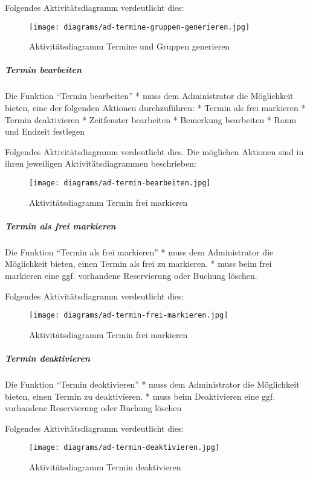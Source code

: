 \documentclass[]{article}
\let\oldsubparagraph\subparagraph
\renewcommand{\subparagraph}[1]{\oldsubparagraph{#1}\mbox{}}
\begin{document}
Folgendes Aktivitätsdiagramm verdeutlicht dies:

\begin{figure}
\centering
\texttt{[image: diagrams/ad-termine-gruppen-generieren.jpg]}
\caption{Aktivitätsdiagramm Termine und Gruppen generieren}
\end{figure}

\hypertarget{termin-bearbeiten-1}{%
\subparagraph{Termin bearbeiten}\label{termin-bearbeiten-1}}

Die Funktion ``Termin bearbeiten'' * muss dem Administrator die
Möglichkeit bieten, eine der folgenden Aktionen durchzuführen: * Termin
als frei markieren * Termin deaktivieren * Zeitfenster bearbeiten *
Bemerkung bearbeiten * Raum und Endzeit festlegen

Folgendes Aktivitätsdiagramm verdeutlicht dies. Die möglichen Aktionen
sind in ihren jeweiligen Aktivitätsdiagrammen beschrieben:

\begin{figure}
\centering
\texttt{[image: diagrams/ad-termin-bearbeiten.jpg]}
\caption{Aktivitätsdiagramm Termin frei markieren}
\end{figure}

\hypertarget{termin-als-frei-markieren}{%
\subparagraph{Termin als frei
markieren}\label{termin-als-frei-markieren}}

Die Funktion ``Termin als frei markieren'' * muss dem Administrator die
Möglichkeit bieten, einen Termin als frei zu markieren. * muss beim frei
markieren eine ggf. vorhandene Reservierung oder Buchung löschen.

Folgendes Aktivitätsdiagramm verdeutlicht dies:

\begin{figure}
\centering
\texttt{[image: diagrams/ad-termin-frei-markieren.jpg]}
\caption{Aktivitätsdiagramm Termin frei markieren}
\end{figure}

\hypertarget{termin-deaktivieren}{%
\subparagraph{Termin deaktivieren}\label{termin-deaktivieren}}

Die Funktion ``Termin deaktivieren'' * muss dem Administrator die
Möglichkeit bieten, einen Termin zu deaktivieren. * muss beim
Deaktivieren eine ggf. vorhandene Reservierung oder Buchung löschen

Folgendes Aktivitätsdiagramm verdeutlicht dies:

\begin{figure}
\centering
\texttt{[image: diagrams/ad-termin-deaktivieren.jpg]}
\caption{Aktivitätsdiagramm Termin deaktivieren}
\end{figure}
\end{document}
